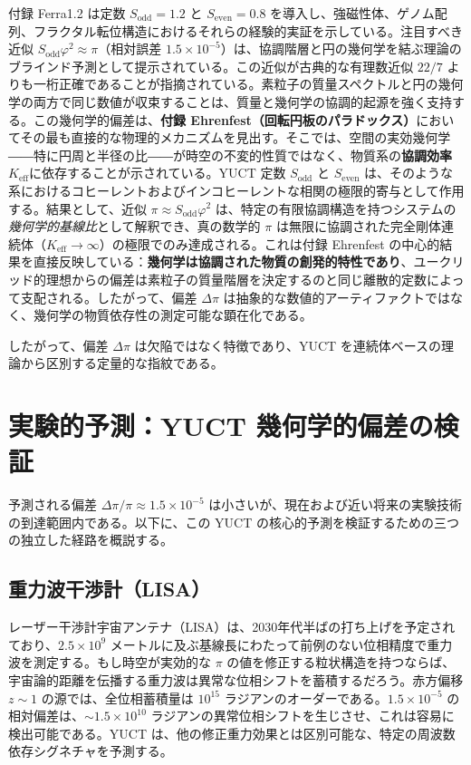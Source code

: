 \documentclass[11pt,a4paper]{article}
\begin{document}
	付録 Ferra1.2 は定数 \(S_{\mathrm{odd}}=1.2\) と \(S_{\mathrm{even}}=0.8\) を導入し、強磁性体、ゲノム配列、フラクタル転位構造におけるそれらの経験的実証を示している。注目すべき近似 \(S_{\mathrm{odd}}\varphi^2 \approx \pi\)（相対誤差 \(1.5\times10^{-5}\)）は、協調階層と円の幾何学を結ぶ理論のブラインド予測として提示されている。この近似が古典的な有理数近似 \(22/7\) よりも一桁正確であることが指摘されている。素粒子の質量スペクトルと円の幾何学の両方で同じ数値が収束することは、質量と幾何学の協調的起源を強く支持する。この幾何学的偏差は、\textbf{付録 Ehrenfest（回転円板のパラドックス）}においてその最も直接的な物理的メカニズムを見出す。そこでは、空間の実効幾何学――特に円周と半径の比――が時空の不変的性質ではなく、物質系の\textbf{協調効率 \(K_{\mathrm{eff}}\)}に依存することが示されている。YUCT 定数 \(S_{\mathrm{odd}}\) と \(S_{\mathrm{even}}\) は、そのような系におけるコヒーレントおよびインコヒーレントな相関の極限的寄与として作用する。結果として、近似 \(\pi \approx S_{\mathrm{odd}}\varphi^2\) は、特定の有限協調構造を持つシステムの\textit{幾何学的基線比}として解釈でき、真の数学的 \(\pi\) は無限に協調された完全剛体連続体（\(K_{\mathrm{eff}} \to \infty\)）の極限でのみ達成される。これは付録 Ehrenfest の中心的結果を直接反映している：\textbf{幾何学は協調された物質の創発的特性であり}、ユークリッド的理想からの偏差は素粒子の質量階層を決定するのと同じ離散的定数によって支配される。したがって、偏差 \(\Delta\pi\) は抽象的な数値的アーティファクトではなく、幾何学の物質依存性の測定可能な顕在化である。
	
	したがって、偏差 \(\Delta\pi\) は欠陥ではなく特徴であり、YUCT を連続体ベースの理論から区別する定量的な指紋である。
	
	\section{実験的予測：YUCT 幾何学的偏差の検証}
	
	予測される偏差 \(\Delta\pi/\pi \approx 1.5\times10^{-5}\) は小さいが、現在および近い将来の実験技術の到達範囲内である。以下に、この YUCT の核心的予測を検証するための三つの独立した経路を概説する。
	
	\subsection{重力波干渉計（LISA）}
	
	レーザー干渉計宇宙アンテナ（LISA）は、2030年代半ばの打ち上げを予定されており、\(2.5\times10^9\) メートルに及ぶ基線長にわたって前例のない位相精度で重力波を測定する。もし時空が実効的な \(\pi\) の値を修正する粒状構造を持つならば、宇宙論的距離を伝播する重力波は異常な位相シフトを蓄積するだろう。赤方偏移 \(z \sim 1\) の源では、全位相蓄積量は \(10^{15}\) ラジアンのオーダーである。\(1.5\times10^{-5}\) の相対偏差は、\(\sim 1.5\times10^{10}\) ラジアンの異常位相シフトを生じさせ、これは容易に検出可能である。YUCT は、他の修正重力効果とは区別可能な、特定の周波数依存シグネチャを予測する。
	
\end{document}
